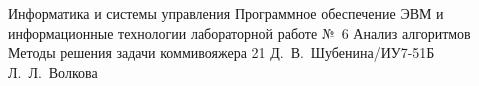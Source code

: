 \makereporttitle
    {Информатика и системы управления} %
    {Программное обеспечение ЭВМ и информационные технологии} %
    {лабораторной работе №~6} %
    {Анализ алгоритмов} %
    {Методы решения задачи коммивояжера} %
    {21} %
    {Д.~В.~Шубенина/ИУ7-51Б} %
	{Л.~Л.~Волкова} %